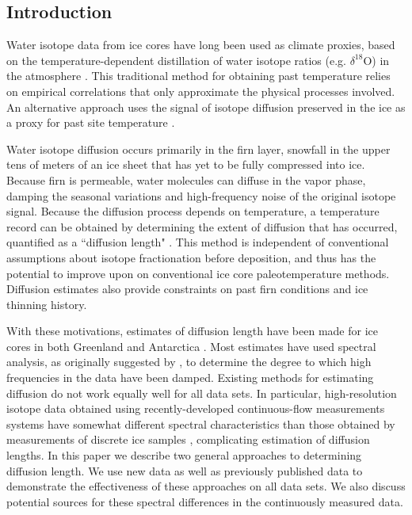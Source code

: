 \documentclass[draft, jgrga]{AGUTeX}
\begin{document}


\begin{article}

\section{Introduction}

Water isotope data from ice cores have long been used as climate proxies, based on the temperature-dependent distillation of water isotope ratios (e.g. $\delta^{18}$O) in the atmosphere \citep{Epstein1951,Dansgaard1954,Dansgaard1964}. This traditional method for obtaining past temperature relies on empirical correlations that only approximate the physical processes involved. An alternative approach uses the signal of isotope diffusion preserved in the ice as a proxy for past site temperature \citep{Johnsen2000}.

Water isotope diffusion occurs primarily in the firn layer, snowfall in the upper tens of meters of an ice sheet that has yet to be fully compressed into ice. Because firn is permeable, water molecules can diffuse in the vapor phase, damping the seasonal variations and high-frequency noise of the original isotope signal. Because the diffusion process depends on temperature, a temperature record can be obtained by determining the extent of diffusion that has occurred, quantified as a ``diffusion length" \citep{Johnsen2000}. This method is independent of conventional assumptions about isotope fractionation before deposition, and thus has the potential to improve upon on conventional ice core paleotemperature methods. Diffusion estimates also provide constraints on past firn conditions and ice thinning history.

With these motivations, estimates of diffusion length have been made for ice cores in both Greenland and Antarctica \citep{Simonsen2011,Gkinis2014,vanderWel2015,Jones2017a,Holme2017}. Most estimates have used spectral analysis, as originally suggested by \citet{Johnsen1977}, to determine the degree to which high frequencies in the data have been damped. Existing methods for estimating diffusion do not work equally well for all data sets. In particular, high-resolution isotope data obtained using recently-developed continuous-flow measurements systems have somewhat different spectral characteristics than those obtained by measurements of discrete ice samples \citep{Jones2017a},  complicating estimation of diffusion lengths. In this paper we describe two general approaches to determining diffusion length. We use new data as well as previously published data to demonstrate the effectiveness of these approaches on all data sets. We also discuss potential sources for these spectral differences in the continuously measured data.


\end{article}
\end{document}
